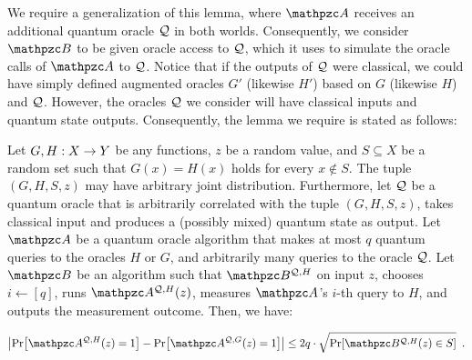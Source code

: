 We require a generalization of this lemma, where $\qA$ receives an
additional quantum oracle $\mathcal{Q}$ in both worlds. Consequently, we
consider $\qB$ to be given oracle access to $\mathcal{Q}$, which it uses to
simulate the oracle calls of $\qA$ to $\mathcal{Q}$. Notice that if the
outputs of $\mathcal{Q}$ were classical, we could have simply defined
augmented oracles $G'$ (likewise $H'$) based on $G$ (likewise $H$) and
$\mathcal{Q}$.  However, the oracles $\mathcal{Q}$ we consider will have classical
inputs and quantum state outputs. Consequently, the lemma we require
is stated as follows:

\begin{lemma}\label{lem:O2H}
Let $G, H: X \rightarrow Y$ be any functions, $z$ be a random value, and $S
\subseteq X$ be a random set such that $G(x) = H(x)$ holds for every
$x \notin S$. The tuple $(G, H, S, z)$ may have arbitrary joint
distribution. Furthermore, let $\mathcal{Q}$ be a quantum oracle that is
arbitrarily correlated with the tuple $(G, H, S, z)$, takes
classical input and produces a (possibly mixed) quantum state as
output. Let $\qA$ be a quantum oracle algorithm that makes at most $q$
quantum queries to the oracles $H$ or $G$, and arbitrarily many
queries to the oracle $\mathcal{Q}$. Let $\qB$ be an algorithm such that
$\qB^{\cQ, H}$ on input $z$, chooses $i \gets [q]$, runs $\qA^{\cQ,
H}(z)$, measures $\qA$'s $i$-th query to $H$, and outputs the measurement
outcome. Then, we have:

\begin{align}
\abs{\Pr[\qA^{\cQ, H}(z)=1]-\Pr[\qA^{\cQ, G}(z)=1]} \leq
2q\cdot\sqrt{\Pr[\qB^{\cQ, H}(z)\in S]}
\enspace.
\end{align}

\end{lemma}

